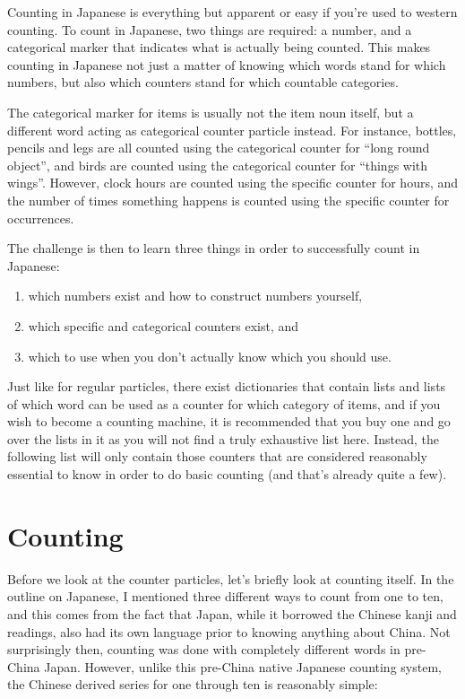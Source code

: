 \documentclass[11pt, b5paper, twoside, openright, onecolumn]{book}
\begin{document}
Counting in Japanese is everything but apparent or easy if you’re used to western counting. To count in Japanese‚ two things are required: a number‚ and a categorical marker that indicates what is actually being counted. This makes counting in Japanese not just a matter of knowing which words stand for which numbers‚ but also which counters stand for which countable categories.

The categorical marker for items is usually not the item noun itself‚ but a different word acting as categorical counter particle instead. For instance‚ bottles‚ pencils and legs are all counted using the categorical counter for “long round object”‚ and birds are counted using the categorical counter for “things with wings”. However‚ clock hours are counted using the specific counter for hours‚ and the number of times something happens is counted using the specific counter for occurrences.

The challenge is then to learn three things in order to successfully count in Japanese:

\begin{enumerate}
\item which numbers exist and how to construct numbers yourself‚
\item which specific and categorical counters exist‚ and
\item which to use when you don’t actually know which you should use.
\end{enumerate}

Just like for regular particles‚ there exist dictionaries that contain lists and lists of which word can be used as a counter for which category of items‚ and if you wish to become a counting machine‚ it is recommended that you buy one and go over the lists in it as you will not find a truly exhaustive list here. Instead‚ the following list will only contain those counters that are considered reasonably essential to know in order to do basic counting (and that’s already quite a few).

\section{Counting}

Before we look at the counter particles‚ let’s briefly look at counting itself. In the outline on Japanese‚ I mentioned three different ways to count from one to ten‚ and this comes from the fact that Japan‚ while it borrowed the Chinese kanji and readings‚ also had its own language prior to knowing anything about China. Not surprisingly then‚ counting was done with completely different words in pre-China Japan. However‚ unlike this pre-China native Japanese counting system‚ the Chinese derived series for one through ten is reasonably simple:
\end{document}
